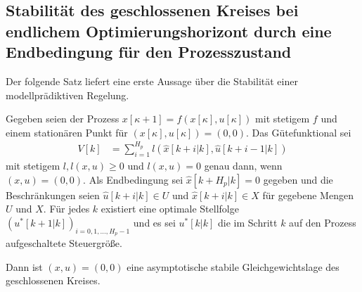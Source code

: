 \subsection{Stabilität des geschlossenen Kreises bei endlichem Optimierungshorizont durch eine Endbedingung für den Prozesszustand}
\label{subsec:kap_4_stab_geschl_rk}
Der folgende Satz liefert eine erste Aussage über die Stabilität einer modellprädiktiven Regelung.
\begin{satz}\label{satz:kap_4_stabilitaet}
Gegeben seien der Prozess $x[\kappa +1]=f(x[\kappa],u[\kappa])$ mit stetigem $f$ und einem stationären Punkt für $(x[\kappa],u[\kappa])=(0,0)$. Das Gütefunktional sei
\begin{align*}
	V[k] & = \sum\limits_{i=1}^{H_p}l\left( \hat{x}[k+i|k],\hat{u}[k+i-1|k] \right)
\end{align*}
mit stetigem $l,l(x,u)\ge 0$ und $l(x,u)=0$ genau dann, wenn $(x,u)=(0,0)$. Als Endbedingung sei $\hat{x}[k+H_p|k]=0$ gegeben und die Beschränkungen seien $\hat{u}[k+i|k]\in U$ und
$\hat{x}[k+i|k]\in X$ für gegebene Mengen $U$ und $X$. Für jedes $k$ existiert eine optimale Stellfolge $\left(u^{\ast}[k+1|k]\right)_{i=0,1,\ldots,H_p-1}$ und es sei $u^{\ast}[k|k]$
die im Schritt $k$ auf den Prozess aufgeschaltete Steuergröße.

Dann ist $(x,u)=(0,0)$ eine asymptotische stabile Gleichgewichtslage des geschlossenen Kreises.
\end{satz}
